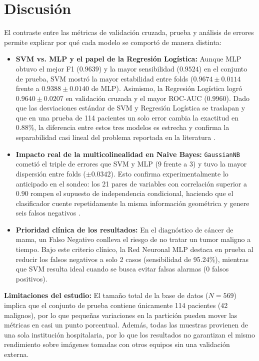 \documentclass[conference]{IEEEtran}
\begin{document}
\section{Discusión}

El contraste entre las métricas de validación cruzada, prueba y análisis de errores permite explicar por qué cada modelo se comportó de manera distinta:

\begin{itemize}
    \item \textbf{SVM vs. MLP y el papel de la Regresión Logística:} Aunque MLP obtuvo el mejor F1 ($0.9639$) y la mayor sensibilidad ($0.9524$) en el conjunto de prueba, SVM mostró la mayor estabilidad entre folds ($0.9674 \pm 0.0114$ frente a $0.9388 \pm 0.0140$ de MLP). Asimismo, la Regresión Logística logró $0.9640 \pm 0.0207$ en validación cruzada y el mayor ROC-AUC ($0.9960$). Dado que las desviaciones estándar de SVM y Regresión Logística se traslapan y que en una prueba de 114 pacientes un solo error cambia la exactitud en 0.88\%, la diferencia entre estos tres modelos es estrecha y confirma la separabilidad casi lineal del problema reportada en la literatura \cite{mangasarian1995}.
    \item \textbf{Impacto real de la multicolinealidad en Naive Bayes:} \texttt{GaussianNB} cometió el triple de errores que SVM y MLP (9 frente a 3) y tuvo la mayor dispersión entre folds ($\pm 0.0342$). Esto confirma experimentalmente lo anticipado en el sondeo: los 21 pares de variables con correlación superior a $0.90$ rompen el supuesto de independencia condicional, haciendo que el clasificador cuente repetidamente la misma información geométrica y genere seis falsos negativos \cite{rish2001}.
    \item \textbf{Prioridad clínica de los resultados:} En el diagnóstico de cáncer de mama, un Falso Negativo conlleva el riesgo de no tratar un tumor maligno a tiempo. Bajo este criterio clínico, la Red Neuronal MLP destaca en prueba al reducir los falsos negativos a solo 2 casos (sensibilidad de 95.24\%), mientras que SVM resulta ideal cuando se busca evitar falsas alarmas (0 falsos positivos).
\end{itemize}

\textbf{Limitaciones del estudio:} El tamaño total de la base de datos ($N = 569$) implica que el conjunto de prueba contiene únicamente 114 pacientes (42 malignos), por lo que pequeñas variaciones en la partición pueden mover las métricas en casi un punto porcentual. Además, todas las muestras provienen de una sola institución hospitalaria, por lo que los resultados no garantizan el mismo rendimiento sobre imágenes tomadas con otros equipos sin una validación externa.
\end{document}
